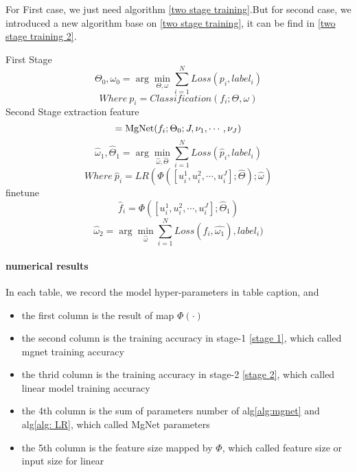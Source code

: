 For First case, we just need algorithm \ref{two stage training}.But for second case, we introduced a new algorithm base on \ref{two stage training}, it can be find in \ref{two stage training 2}. 
\begin{breakablealgorithm}
	\caption{$[\hat{\omega}_2]={\rm Two \ Stage \ Training \ With \ Trainable\  \Phi \ }(\{f_i\}_1^N; \{label_i\}_1^N,\Phi(\cdot;\cdot),J,\nu_1, \cdots, \nu_J)$}
	\label{two stage training 2}
	\begin{algorithmic}
		\State First Stage
		\begin{equation}
		\Theta_0,\omega_0 = \arg \min_{\Theta,\omega} \sum_{i=1}^N Loss(p_i, label_i )
		\end{equation}
		\begin{equation}
		Where\  p_i = Classification(f_i; \Theta,\omega) 
		\end{equation}
		\State Second Stage
		\State extraction feature
		\begin{equation}
		[u_i^1,u_i^2,\cdots,u_i^J]={\rm MgNet}(f_i; \Theta_0;J,\nu_1, \cdots, \nu_J) 
		\end{equation}
		\EndFor
		\begin{equation}
		\hat{\omega}_1,\hat{\Theta}_1 = \arg \min_{\hat{\omega},\hat{\Theta}} \sum_{i=1}^N Loss(\hat{p}_i, label_i )
		\end{equation}
		\begin{equation}
		Where\  \hat{p}_i = LR(\Phi([u_i^1,u_i^2,\cdots,u_i^J];\hat{\Theta}); \hat{\omega})
		\end{equation}
		\State finetune
		\begin{equation}
		\hat{f}_i = \Phi([u_i^1,u_i^2,\cdots,u_i^J]; \hat{\Theta}_1)
		\end{equation}
		\EndFor
		\begin{equation}
		\hat{\omega}_2 = \arg \min_{\hat{\omega}} \sum_{i=1}^N Loss(\hat{f}_i, \hat{\omega_1}), label_i )
		\end{equation}
	\end{algorithmic}
\end{breakablealgorithm}

\paragraph{numerical results}
In each table, we record the model hyper-parameters in table caption, and
\begin{itemize}
	\item the first column is the result of map $\Phi(\cdot)$
	\item the second column is the training accuracy in stage-1 \ref{stage 1}, which called mgnet training accuracy
	\item the thrid column is the training accuracy in stage-2 \ref{stage 2}, which called linear model training accuracy
	\item the 4th column is the sum of parameters number of alg\ref{alg:mgnet} and alg\ref{alg: LR}, which called MgNet parameters
	\item the 5th column is the feature size mapped by $\Phi$, which called feature size or input size for linear
\end{itemize}

